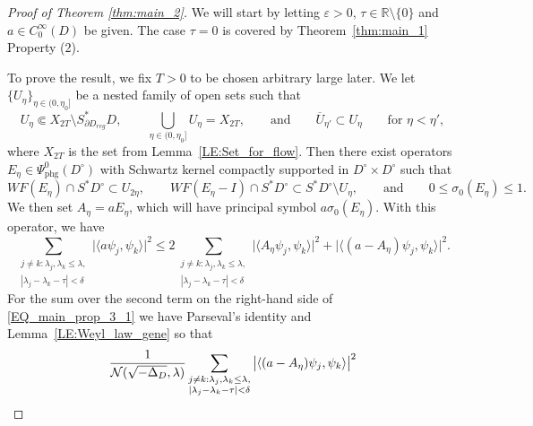 \documentclass[10pt,a4paper]{amsart}
\newcommand{\R}{\mathbb{R}}
\newcommand{\1}{\mathrm{\mathbf{1}}}
\numberwithin{equation}{section}
\begin{document}
\begin{proof}[Proof of Theorem \ref{thm:main_2}]
We will start by letting $\varepsilon>0$, $\tau\in\R \setminus\{0\}$ and $a\in C_0^\infty(D)$ be given. The case $\tau=0$ is covered by Theorem~\ref{thm:main_1} Property (2).

To prove the result, we fix $T>0$ to be chosen arbitrary large later. We let $\{U_\eta\}_{\eta\in(0,\eta_0]}$ be a nested family of open sets such that 
\begin{equation*}
    U_\eta \Subset X_{2T}\setminus S^{*}_{\partial D_{reg}} D,\qquad \bigcup_{\eta\in(0,\eta_0]} U_\eta = X_{2T}, \qquad\text{and}\qquad \overline{U}_{\eta'} \subset U_\eta \qquad\text{for $\eta<\eta'$},
\end{equation*} 
where $X_{2T}$ is the set from Lemma~\ref{LE:Set_for_flow}. Then there exist operators $E_\eta \in \Psi^0_{\mathrm{phg}}(D^{\circ})$ with Schwartz kernel compactly supported in $D^{\circ}\times D^{\circ}$ such that
\begin{equation*}
    WF(E_\eta) \cap S^{*}D^{\circ} \subset U_{2\eta}, \qquad WF(E_\eta - I) \cap S^{*}D^{\circ} \subset S^{*}D^{\circ} \setminus U_{\eta}, \qquad\text{and}\qquad 0\leq \sigma_0(E_\eta)\leq 1.
\end{equation*}
We then set $A_\eta = a E_\eta $, which will have principal symbol $a\sigma_0(E_\eta)$. With this operator, we have
\begin{equation}\label{EQ_main_prop_3_1}
    \sum_{\substack{j\neq k: \lambda_j,\lambda_k\leq \lambda,  \\ |\lambda_{j}-\lambda_{k}-\tau| < \delta}} \big| \langle a \psi_j , \psi_k\rangle  \big|^2 
    \leq 2\sum_{\substack{j\neq k: \lambda_j,\lambda_k\leq \lambda,  \\ |\lambda_{j}-\lambda_{k}-\tau| < \delta}} \big| \langle A_\eta \psi_j , \psi_k\rangle  \big|^2 + \big| \langle (a- A_\eta) \psi_j , \psi_k\rangle  \big|^2.
\end{equation}
%
For the sum over the second term on the right-hand side of \eqref{EQ_main_prop_3_1} we have Parseval's identity and Lemma~\ref{LE:Weyl_law_gene} so that
%
\begin{equation}\label{EQ_main_prop_3_2}
    \begin{aligned}
    \MoveEqLeft \frac{1}{\mathcal{N}(\sqrt{-\Delta_D},\lambda)}\sum_{\substack{j\neq k: \lambda_j,\lambda_k\leq \lambda,  \\ |\lambda_{j}-\lambda_{k}-\tau| < \delta}} \big| \langle (a- A_\eta) \psi_j , \psi_k\rangle \big|^2 
    \\

\end{aligned}
\end{equation}
\end{proof}
\end{document}
